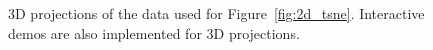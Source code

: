 \documentclass[runningheads,a4paper]{llncs}
\begin{document}
\begin{appendices}
\begin{figure}[]
\caption{3D projections of the data used for Figure~\ref{fig:2d_tsne}. Interactive demos are also implemented for 3D projections.}
\label{fig:3d_tsne}
\end{figure}



\end{appendices}
\end{document}
